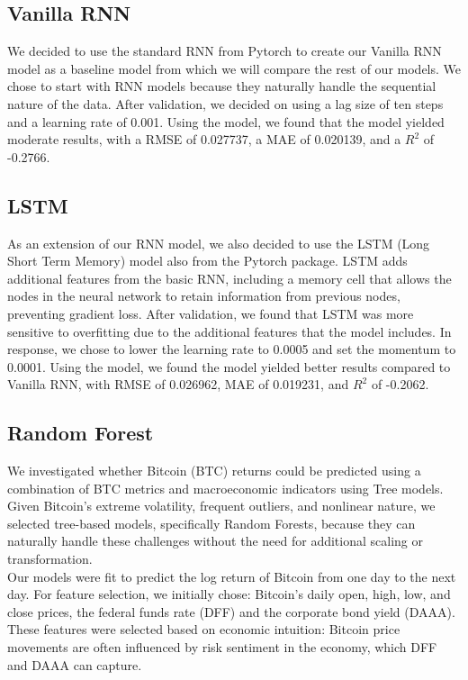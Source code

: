 \documentclass{article}
\begin{document}
\subsection{Vanilla RNN}

We decided to use the standard RNN from Pytorch to create our Vanilla RNN model as a baseline model from which we will compare the rest of our models. We chose to start with RNN models because they naturally handle the sequential nature of the data. After validation, we decided on using a lag size of ten steps and a learning rate of 0.001. Using the model, we found that the model yielded moderate results, with a RMSE of 0.027737, a MAE of 0.020139, and a $R^2$ of -0.2766. 

\subsection{LSTM}

As an extension of our RNN model, we also decided to use the LSTM (Long Short Term Memory) model also from the Pytorch package. LSTM adds additional features from the basic RNN, including a memory cell that allows the nodes in the neural network to retain information from previous nodes, preventing gradient loss. After validation, we found that LSTM was more sensitive to overfitting due to the additional features that the model includes. In response, we chose to lower the learning rate to 0.0005 and set the momentum to 0.0001. Using the model, we found the model yielded better results compared to Vanilla RNN, with RMSE of 0.026962, MAE of 0.019231, and $R^2$ of -0.2062.


\subsection{Random Forest}
We investigated whether Bitcoin (BTC) returns could be predicted using a combination of BTC metrics and macroeconomic indicators using Tree models. Given Bitcoin’s extreme volatility, frequent outliers, and nonlinear nature, we selected tree-based models, specifically Random Forests, because they can naturally handle these challenges without the need for additional scaling or transformation.\\

Our models were fit to predict the log return of Bitcoin from one day to the next day. For feature selection, we initially chose: Bitcoin’s daily open, high, low, and close prices, the federal funds rate (DFF) and the corporate bond yield (DAAA). These features were selected based on economic intuition: Bitcoin price movements are often influenced by risk sentiment in the economy, which DFF and DAAA can capture.\\
\end{document}
